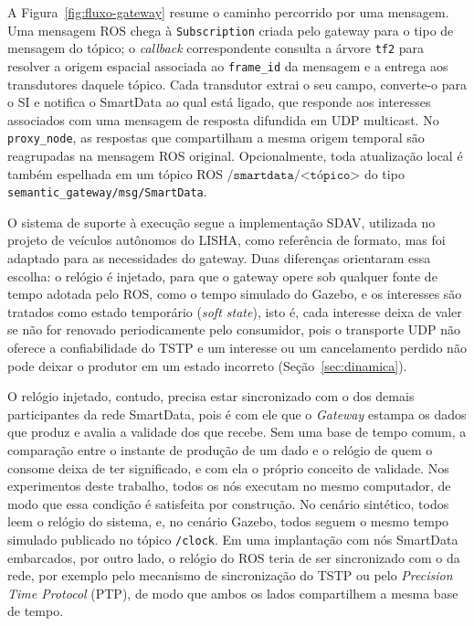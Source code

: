 \documentclass[
    12pt,
    oneside,
    a4paper,
    chapter=TITLE,
    section=TITLE,
    english,
    brazil
]{abntex2}
\begin{document}
A Figura~\ref{fig:fluxo-gateway} resume o caminho percorrido por uma
mensagem. Uma mensagem ROS chega à \texttt{Subscription} criada
pelo gateway para o tipo de mensagem do tópico; o \textit{callback} correspondente consulta a árvore
\texttt{tf2} para resolver a origem espacial associada ao
\texttt{frame\_id} da mensagem e a entrega aos transdutores daquele
tópico. Cada transdutor extrai o seu campo, converte-o para o SI e
notifica o SmartData ao qual está ligado, que responde aos interesses
associados com uma mensagem de resposta difundida em UDP multicast. No
\texttt{proxy\_node}, as respostas que compartilham a mesma origem temporal
são reagrupadas na mensagem ROS original. Opcionalmente, toda atualização
local é também espelhada em um tópico ROS \(\texttt{/smartdata/<tópico>}\)
do tipo \texttt{semantic\_gateway/msg/SmartData}.

O sistema de suporte à execução segue a implementação SDAV, utilizada no projeto de
veículos autônomos do LISHA, como
referência de formato, mas foi adaptado para as necessidades do gateway.
Duas diferenças orientaram essa escolha: o relógio é injetado, para que
o gateway opere sob qualquer fonte de tempo adotada pelo ROS, como o
tempo simulado do Gazebo, e os interesses são tratados como estado
temporário (\textit{soft state}), isto é, cada interesse deixa de valer
se não for renovado periodicamente pelo consumidor, pois o transporte UDP
não oferece a confiabilidade do TSTP e um interesse ou um cancelamento
perdido não pode deixar o produtor em um estado incorreto
(Seção~\ref{sec:dinamica}).

O relógio injetado, contudo, precisa estar sincronizado com o dos demais
participantes da rede SmartData, pois é com ele que o \textit{Gateway}
estampa os dados que produz e avalia a validade dos que recebe. Sem uma
base de tempo comum, a comparação entre o instante de produção de um dado
e o relógio de quem o consome deixa de ter significado, e com ela o
próprio conceito de validade. Nos experimentos deste trabalho, todos os
nós executam no mesmo computador, de modo que essa condição é satisfeita
por construção. No cenário sintético, todos leem o relógio do sistema,
e, no cenário Gazebo, todos seguem o mesmo tempo simulado publicado no
tópico \texttt{/clock}. Em uma implantação com nós SmartData embarcados,
por outro lado, o relógio do ROS teria de ser sincronizado com o da rede,
por exemplo pelo mecanismo de sincronização do TSTP ou pelo
\textit{Precision Time Protocol} (PTP), de modo que ambos os lados
compartilhem a mesma base de tempo.
\end{document}
